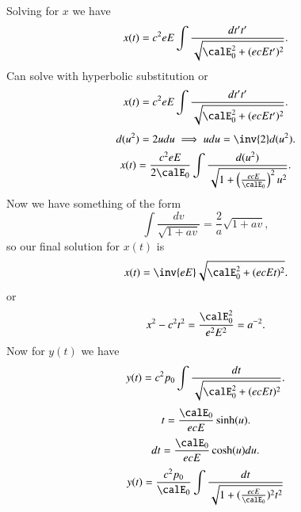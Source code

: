 {Solving for \(x\) we have
%
\begin{equation}\label{eqn:relativisticElectrodynamicsT3:220}
x(t) = c^2 e E \int \frac{dt' t'}{\sqrt{ \calE_0^2 + (e c E t')^2 }}.
\end{equation}
%
Can solve with hyperbolic substitution or
%
\begin{equation}\label{eqn:relativisticElectrodynamicsT3:240}
x(t) = c^2 e E \int \frac{dt' t'}{\sqrt{ \calE_0^2 + (e c E t')^2 }}.
\end{equation}
%
\begin{equation}\label{eqn:relativisticElectrodynamicsT3:260}
d(u^2) = 2 u du \implies u du = \inv{2} d(u^2).
\end{equation}
%
\begin{equation}\label{eqn:relativisticElectrodynamicsT3:280}
x(t) = \frac{c^2 e E}{2 \calE_0} \int \frac{d (u^2)}{\sqrt{ 1 + \left(\frac{e c E}{\calE_0}\right)^2 u^2 }}.
\end{equation}
%
Now we have something of the form
%
\begin{equation}\label{eqn:relativisticElectrodynamicsT3:290}
\int \frac{d v}{\sqrt{1 + a v}} = \frac{2}{a} \sqrt{1 + a v},
\end{equation}
%
so our final solution for \(x(t)\) is
%
\begin{equation}\label{eqn:relativisticElectrodynamicsT3:300}
x(t) = \inv{e E} \sqrt{ \calE_0^2 + (e c E t)^2 }.
\end{equation}
%
or
%
\begin{equation}\label{eqn:relativisticElectrodynamicsT3:320}
x^2 - c^2 t^2 = \frac{\calE_0^2}{ e^2 E^2 } = a^{-2}.
\end{equation}
%
Now for \(y(t)\) we have
%
\begin{equation}\label{eqn:relativisticElectrodynamicsT3:340}
y(t) = c^2 p_0 \int \frac{dt}{ \sqrt{\calE_0^2 + (e c E t)^2 }}.
\end{equation}
%
\begin{equation}\label{eqn:relativisticElectrodynamicsT3:360}
t = \frac{\calE_0}{ e c E} \sinh(u).
\end{equation}
%
\begin{equation}\label{eqn:relativisticElectrodynamicsT3:380}
dt = \frac{\calE_0}{ e c E} \cosh(u) du.
\end{equation}
%
\begin{equation}\label{eqn:relativisticElectrodynamicsT3:970}
\begin{aligned}
y(t)
&= \frac{c^2 p_0}{\calE_0} \int \frac{dt}{\sqrt{1 + (\frac{e c E}{\calE_0})^2 t^2 }} \\

\end{aligned}
\end{equation}}
